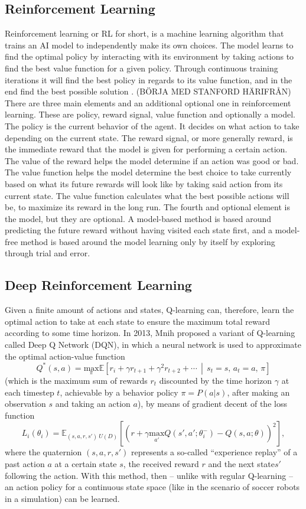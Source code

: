 \subsection{Reinforcement Learning}
Reinforcement learning or RL for short, is a machine learning algorithm that trains an AI model to independently make its own choices. The model learns to find the optimal policy by interacting with its environment by taking actions to find the best value function for a given policy. Through continuous training iterations it will find the best policy in regards to its value function, and in the end find the best possible solution \cite{ieeeRL1}. (BÖRJA MED STANFORD HÄRIFRÅN)
There are three main elements and an additional optional one in reinforcement learning. These are policy, reward signal, value function and optionally a model. The policy is the current behavior of the agent. It decides on what action to take depending on the current state. The reward signal, or more generally reward, is the immediate reward that the model is given for performing a certain action. The value of the reward helps the model determine if an action was good or bad. The value function helps the model determine the best choice to take currently based on what its future rewards will look like by taking said action from its current state. The value function calculates what the best possible actions will be, to maximize its reward in the long run. The fourth and optional element is the model, but they are optional. A model-based method is based around predicting the future reward without having visited each state first, and a model-free method is based around the model learning only by itself by exploring through trial and error.


\subsection{Deep Reinforcement Learning}
Given a finite amount of actions and states, Q-learning can, therefore, learn the optimal action to take at each state to ensure the maximum total reward according to some time horizon. In 2013, Mnih\cite{DQN} proposed a variant of Q-learning called Deep Q Network (DQN), in which a neural network is used to approximate the optimal action-value function
\[
    Q^*(s,a)=\underset \pi {\text{max}} \mathbb{E}\left[ r_i+\gamma r_{t+1}+\gamma^2 r_{t+2}+\cdots \,\middle|\, s_t=s,\,a_t=a,\,\pi \right]
\]
(which is the maximum sum of rewards \(r_t\) discounted by the time horizon \(\gamma\) at each timestep \(t\), achievable by a behavior policy \(\pi=P(a|s)\), after making an observation \(s\) and taking an action \(a\)), by means of gradient decent of the loss function
\[
L_i(\theta_i)=\mathbb{E}_{(s,a,r,s')~U(D)}\left[\left(r+ \gamma \underset {a'} {\text{max}} Q(s',a';\theta^-_i)-Q(s,a;\theta)\right)^2\right]
,\]
where the quaternion \((s,a,r,s')\) represents a so-called ``experience replay'' of a past action \(a\) at a certain state \(s\), the received reward \(r\) and the next state\(s'\) following the action. With this method, then -- unlike with regular Q-learning -- an action policy for a continuous state space (like in the scenario of soccer robots in a simulation) can be learned.

